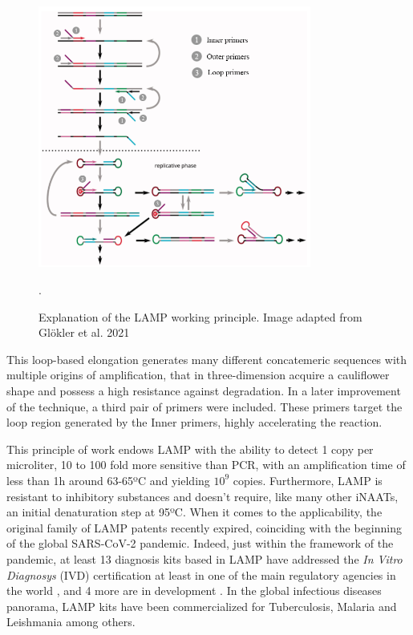 \begin{figure}[b]
    \centering
    \includegraphics[width=0.8\textwidth]{figures/lamp.png}
    \caption[Explanation of the LAMP working principle.]{Explanation of the LAMP working principle. Image adapted from Glökler et al. 2021 \cite{glokler_isothermal_2021}}.
    \label{fig:LAMP}
\end{figure}

This loop-based elongation generates many different concatemeric sequences with multiple origins of amplification, that in three-dimension acquire a cauliflower shape and possess a high resistance against degradation. In a later improvement of the technique, a third pair of primers were included. These primers target the loop region generated by the Inner primers, highly accelerating the reaction\cite{nagamine_accelerated_2002}.

This principle of work endows LAMP with the ability to detect 1 copy per microliter\cite{zhang_lamp---chip_2019}, 10 to 100 fold more sensitive than PCR, with an amplification time of less than 1h around 63-65ºC and yielding $10^9$ copies\cite{notomi_loop-mediated_2000}. Furthermore, LAMP is resistant to inhibitory substances and doesn't require, like many other iNAATs, an initial denaturation step at 95ºC\cite{enomoto_rapid_2005}\cite{kaneko_tolerance_2007}.
When it comes to the applicability, the original family of LAMP patents recently expired\cite{tsugunori_notomi_hase_tetsu_process_2000}, coinciding with  the beginning of the global SARS-CoV-2 pandemic. Indeed, just within the framework of the pandemic, at least 13 diagnosis kits based in LAMP have addressed the \emph{In Vitro Diagnosys} (IVD) certification at least  in one of the main regulatory agencies in the world \cite{find_sars-cov-2_2022}, and 4 more are in development \cite{find_sars-cov-2_2022-1}. In the global infectious diseases panorama, LAMP kits have been commercialized for Tuberculosis, Malaria and Leishmania among others\cite{oliveira_isothermal_2021}. 

